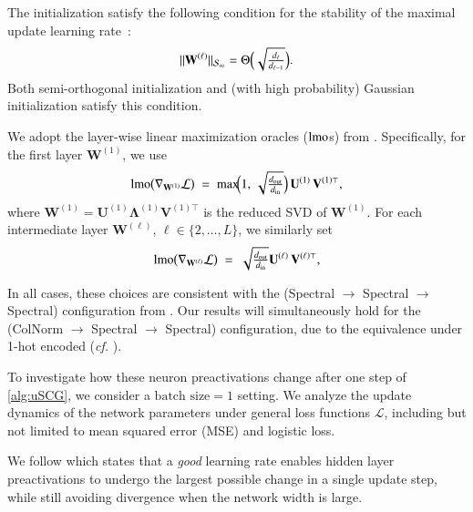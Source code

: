 \begin{assumption}
\label{assumption:initialization}
The initialization satisfy the following condition for the stability of the maximal update learning rate~\citep{yang2023spectral}:
\begin{equation*}
    \| \mathbf{W}^{(\ell)} \|_{\mathcal{S}_\infty} 
      = \Theta\Bigl(\sqrt{\tfrac{d_\ell}{d_{\ell-1}}}\Bigr).
\end{equation*}
Both semi-orthogonal initialization and (with high probability) 
Gaussian initialization satisfy this condition.
\end{assumption}


\begin{assumption}
\label{assumption:lmo_choice}
We adopt the layer-wise linear maximization oracles ($\operatorname{lmo}$s) from . Specifically, 
for the first layer \(\mathbf{W}^{(1)}\), we use
\[
  \operatorname{lmo}\bigl(\nabla_{\mathbf{W}^{(1)}}\mathcal{L}\bigr)
  \;=\; \max\!\Bigl(1,\,\sqrt{\tfrac{d_{\mathrm{out}}}{d_{\mathrm{in}}}}\Bigr)\,\mathbf{U}^{(1)}\,\mathbf{V}^{(1)\top},
\]
where \(\mathbf{W}^{(1)} = \mathbf{U}^{(1)}\mathbf{\Lambda}^{(1)}\mathbf{V}^{(1)\top}\) is the reduced SVD of 
\(\mathbf{W}^{(1)}\). For each intermediate layer \(\mathbf{W}^{(\ell)}\), 
\(\ell \in \{2,\dots,L\}\), we similarly set
\[
  \operatorname{lmo}\bigl(\nabla_{\mathbf{W}^{(\ell)}}\mathcal{L}\bigr)
  \;=\; \sqrt{\tfrac{d_{\mathrm{out}}}{d_{\mathrm{in}}}}\mathbf{U}^{(\ell)}\,\mathbf{V}^{(\ell)\top},
\]
\end{assumption}
\begin{remark}
In all cases, these choices are consistent with the (Spectral $\rightarrow$ Spectral $\rightarrow$ Spectral) configuration from . 
Our results will simultaneously hold for the (ColNorm $\rightarrow$ Spectral $\rightarrow$ Spectral) configuration, due to the equivalence under 1-hot encoded (\textit{cf.} ).
\end{remark}




To investigate how these neuron preactivations change after one step of \cref{alg:uSCG}, we consider a $\text{batch size} = 1$ setting. 
We analyze the update dynamics of the network parameters under general loss functions $\mathcal{L}$, including but not limited to mean squared error (MSE) and logistic loss.

We follow  which states that a \emph{good} learning rate enables hidden layer preactivations to undergo the largest possible change in a single update step, while still avoiding divergence when the network width is large.


